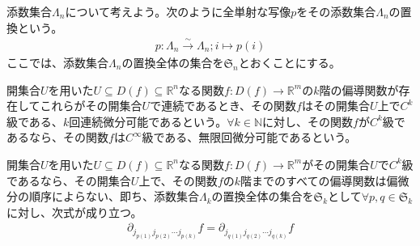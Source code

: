 \documentclass[dvipdfmx]{jsarticle}
\begin{document}
\begin{dfn}
添数集合$\varLambda_{n}$について考えよう。次のように全単射な写像$p$をその添数集合$\varLambda_{n}$の置換という。
\begin{align*}
p:\varLambda_{n}\overset{\sim}{\rightarrow}\varLambda_{n};i \mapsto p(i)
\end{align*}
ここでは、添数集合$\varLambda_{n}$の置換全体の集合を$\mathfrak{S}_{n}$とおくことにする。
\end{dfn}
\begin{dfn}
開集合$U$を用いた$U \subseteq D(f) \subseteq \mathbb{R}^{n}$なる関数$f:D(f) \rightarrow \mathbb{R}^{m}$の$k$階の偏導関数が存在してこれらがその開集合$U$で連続であるとき、その関数$f$はその開集合$U$上で$C^{k}$級である、$k$回連続微分可能であるという。$\forall k \in \mathbb{N}$に対し、その関数$f$が$C^{k}$級であるなら、その関数$f$は$C^{\infty}$級である、無限回微分可能であるという。
\end{dfn}
\begin{thm}\label{4.2.3.6}
開集合$U$を用いた$U \subseteq D(f) \subseteq \mathbb{R}^{n}$なる関数$f:D(f) \rightarrow \mathbb{R}^{m}$がその開集合$U$で$C^{k}$級であるなら、その開集合$U$上で、その関数$f$の$k$階までのすべての偏導関数は偏微分の順序によらない、即ち、添数集合$\varLambda_{k}$の置換全体の集合を$\mathfrak{S}_{k}$として$\forall p,q \in \mathfrak{S}_{k}$に対し、次式が成り立つ。
\begin{align*}
\partial_{j_{p(1)}j_{p(2)}\cdots j_{p(k)}}f = \partial_{j_{q(1)}j_{q(2)}\cdots j_{q(k)}}f
\end{align*}
\end{thm}
\end{document}
